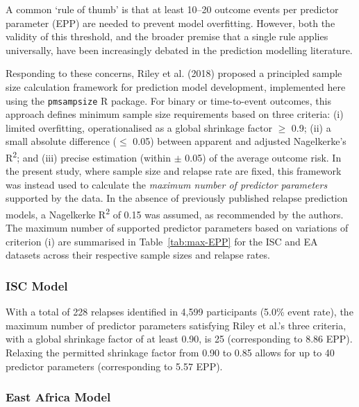 A common `rule of thumb' is that at least 10--20 outcome events per predictor parameter (EPP) are needed to prevent model overfitting\cite{peduzzi1996,harrell2015}. However, both the validity of this threshold, and the broader premise that a single rule applies universally, have been increasingly debated in the prediction modelling literature\cite{courvoisier2011}.

Responding to these concerns, Riley et al. (2018) proposed a principled sample size calculation framework for prediction model development\cite{riley2019A}, implemented here using the \texttt{pmsampsize} R package\cite{ensor2023}. For binary or time-to-event outcomes, this approach defines minimum sample size requirements based on three criteria: (i) limited overfitting, operationalised as a global shrinkage factor $\geq$ 0.9; (ii) a small absolute difference ($\leq$ 0.05) between apparent and adjusted Nagelkerke's R\textsuperscript{2}; and (iii) precise estimation (within $\pm$ 0.05) of the average outcome risk. In the present study, where sample size and relapse rate are fixed, this framework was instead used to calculate the \textit{maximum number of predictor parameters} supported by the data. In the absence of previously published relapse prediction models, a Nagelkerke R\textsuperscript{2} of 0.15 was assumed, as recommended by the authors\cite{riley2019A}. The maximum number of supported predictor parameters based on variations of criterion (i) are summarised in Table~\ref{tab:max-EPP} for the ISC and EA datasets across their respective sample sizes and relapse rates.



\subsubsection{ISC Model}

With a total of 228 relapses identified in 4,599 participants (5.0\% event rate), the maximum number of predictor parameters satisfying Riley et al.'s three criteria, with a global shrinkage factor of at least 0.90, is 25 (corresponding to 8.86 EPP). Relaxing the permitted shrinkage factor from 0.90 to 0.85 allows for up to 40 predictor parameters (corresponding to 5.57 EPP).

\subsubsection{East Africa Model}

